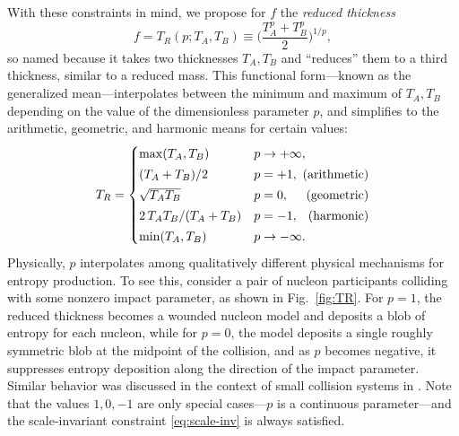 \documentclass[aps,prc,reprint,amsmath]{revtex4-1}
\begin{document}
With these constraints in mind, we propose for $f$ the \emph{reduced thickness}
\begin{equation}
  f = T_R(p; T_A, T_B) \equiv \biggl( \frac{T_A^p + T_B^p}{2} \biggr)^{1/p},
  \label{eq:tr}
\end{equation}
so named because it takes two thicknesses $T_A, T_B$ and ``reduces'' them to a third thickness, similar to a
reduced mass.
This functional form---known as the generalized mean---interpolates between the minimum and maximum of $T_A, T_B$ depending on the value of the dimensionless parameter $p$, and simplifies to the arithmetic, geometric, and harmonic means for certain values:
\begin{equation}
  \newlength{\extraspace}
  \setlength{\extraspace}{0.5ex}
  T_R =
  \begin{cases}
    \max(T_A, T_B) & p \rightarrow +\infty, \\[\extraspace]
    (T_A + T_B)/2 & p = +1, \hfill \text{ (arithmetic)} \\[\extraspace]
    \sqrt{T_A T_B} & p = 0, \hfill \text{ (geometric)} \\[\extraspace]
    2\, T_A T_B/(T_A + T_B) & p = -1, \hfill \text{ (harmonic)} \\[\extraspace]
    \min(T_A, T_B) & p \rightarrow -\infty.
  \end{cases}
\end{equation}
Physically, $p$ interpolates among qualitatively different physical mechanisms for entropy production.
To see this, consider a pair of nucleon participants colliding with some nonzero impact parameter, as shown in Fig.~\ref{fig:TR}.
For $p = 1$, the reduced thickness becomes a wounded nucleon model and deposits a blob of entropy for each nucleon,
while for $p = 0$, the model deposits a single roughly symmetric blob at the midpoint of the collision,
and as $p$ becomes negative, it suppresses entropy deposition along the direction of the impact parameter.
Similar behavior was discussed in the context of small collision systems in \cite{Bzdak:2013zma}.
Note that the values $1, 0, -1$ are only special cases---$p$ is a continuous parameter---and the scale-invariant constraint \eqref{eq:scale-inv} is always satisfied.
\end{document}
